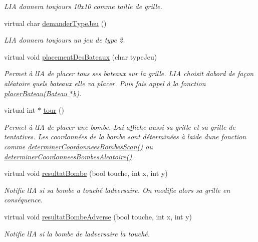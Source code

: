 \begin{DoxyCompactItemize}
\begin{DoxyCompactList}\small\item\em L\textquotesingle{}IA donnera toujours 10x10 comme taille de grille. \end{DoxyCompactList}\item 
virtual char \hyperlink{class_joueur_i_a_a3812f9bf6f315236286ea5ebad576a4f}{demander\+Type\+Jeu} ()
\begin{DoxyCompactList}\small\item\em L\textquotesingle{}IA donnera toujours un jeu de type 2. \end{DoxyCompactList}\item 
virtual void \hyperlink{class_joueur_i_a_a6d7592fa8c653cb5420270d61467419b}{placement\+Des\+Bateaux} (char type\+Jeu)
\begin{DoxyCompactList}\small\item\em Permet à l\textquotesingle{}IA de placer tous ses bateaux sur la grille. L\textquotesingle{}IA choisit d\textquotesingle{}abord de façon aléatoire quels bateaux elle va placer. Puis fais appel à la fonction \hyperlink{class_joueur_i_a_a70a56322ca6eeeb52612510d7e22d388}{placer\+Bateau(\+Bateau $\ast$b)}. \end{DoxyCompactList}\item 
virtual int $\ast$ \hyperlink{class_joueur_i_a_a76b3e9af59c86acb34d7e1cb70802436}{tour} ()
\begin{DoxyCompactList}\small\item\em Permet à l\textquotesingle{}IA de placer une bombe. Lui affiche aussi sa grille et sa grille de tentatives. Les coordonnées de la bombe sont déterminées à l\textquotesingle{}aide d\textquotesingle{}une fonction comme \hyperlink{class_joueur_i_a_af67d4959a40d9e99f0f8d99eaaf73c49}{determiner\+Coordonnees\+Bombes\+Scan()} ou \hyperlink{class_joueur_i_a_ad1fa6503f6fce1560129ee8cb94a1475}{determiner\+Coordonnees\+Bombes\+Aleatoire()}. \end{DoxyCompactList}\item 
virtual void \hyperlink{class_joueur_i_a_a5e7ed6369200fe44382a54cf739ad8b3}{resultat\+Bombe} (bool touche, int x, int y)
\begin{DoxyCompactList}\small\item\em Notifie l\textquotesingle{}IA si sa bombe a touché l\textquotesingle{}adversaire. On modifie alors sa grille en conséquence. \end{DoxyCompactList}\item 
virtual void \hyperlink{class_joueur_i_a_a35dfe27baa0fb62a927cc13186b09920}{resultat\+Bombe\+Adverse} (bool touche, int x, int y)
\begin{DoxyCompactList}\small\item\em Notifie l\textquotesingle{}IA si la bombe de l\textquotesingle{}adversaire l\textquotesingle{}a touché. \end{DoxyCompactList}\end{DoxyCompactItemize}
